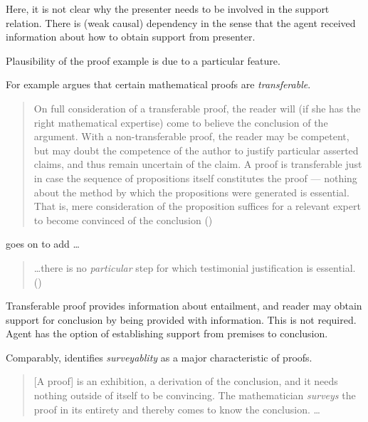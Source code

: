 \begin{note}[Explanation]
  Here, it is not clear why the presenter needs to be involved in the support relation.
  There is (weak causal) dependency in the sense that the agent received information about how to obtain support from presenter.
\end{note}

\begin{note}
  Plausibility of the proof example is due to a particular feature.

  For example \textcite{Easwaran:2009tm} argues that certain mathematical proofs are \emph{transferable}.

  \begin{quote}
    On full consideration of a transferable proof, the reader will (if she has the right mathematical expertise) come to believe the conclusion of the argument.
    With a non-transferable proof, the reader may be competent, but may doubt the competence of the author to justify particular asserted claims, and thus remain uncertain of the claim.
    A proof is transferable just in case the sequence of propositions itself constitutes the proof --- nothing about the method by which the propositions were generated is essential.
    That is, mere consideration of the proposition suffices for a relevant expert to become convinced of the conclusion\nolinebreak
    \mbox{}\hfill\mbox{(\citeyear[354]{Easwaran:2009tm})}
  \end{quote}
  \citeauthor{Easwaran:2009tm} goes on to add \dots
  \begin{quote}
    \dots there is no \emph{particular} step for which testimonial justification is essential.\nolinebreak
    \mbox{}\hfill\mbox{(\citeyear[355]{Easwaran:2009tm})}
  \end{quote}

  Transferable proof provides information about entailment, and reader may obtain support for conclusion by being provided with information.
  This is not required.
  Agent has the option of establishing support from premises to conclusion.

  Comparably, \textcite{Tymoczko:1979tx} identifies \emph{surveyablity} as a major characteristic of proofs.
  \begin{quote}
    [A proof] is an exhibition, a derivation of the conclusion, and it needs nothing outside of itself to be convincing.
    The mathematician \emph{surveys} the proof in its entirety and thereby comes to know the conclusion.
    \dots


\end{quote}
\end{note}
